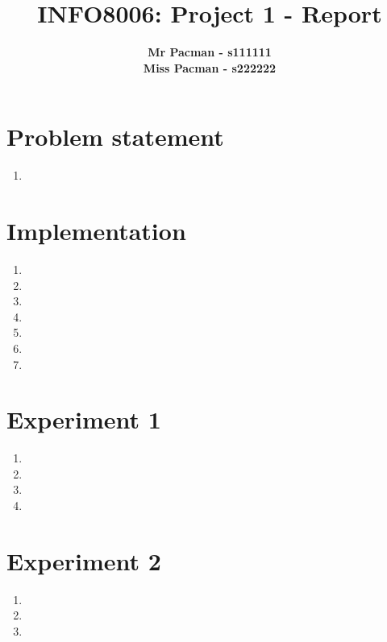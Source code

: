 \documentclass{article}
\begin{document}

\title{\Large{INFO8006: Project 1 - Report}}
\vspace{1cm}
\author{\small{\bf Mr Pacman - s111111} \\ \small{\bf Miss Pacman - s222222}}

\maketitle


\section{Problem statement}

\begin{enumerate}[label=\alph*.]
    \item
\end{enumerate}

\section{Implementation}

\begin{enumerate}[label=\alph*.]
	\item
    \item
    \item
    \item
    \item
    \item
    \item
\end{enumerate}

\section{Experiment 1}

\begin{enumerate}[label=\alph*.]
    \item
    \item
    \item
    \item
\end{enumerate}

\section{Experiment 2}

\begin{enumerate}[label=\alph*.]
    \item
    \item
    \item
\end{enumerate}


\end{document}
